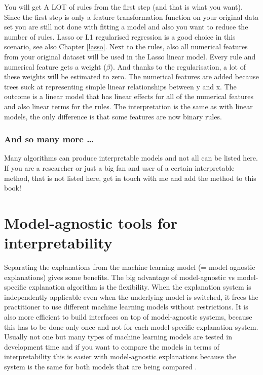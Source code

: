 \documentclass[12pt,]{krantz}
\theoremstyle{definition}
\theoremstyle{definition}
\theoremstyle{definition}
\theoremstyle{remark}
\begin{document}
You will get A LOT of rules from the first step (and that is what you
want). Since the first step is only a feature transformation function on
your original data set you are still not done with fitting a model and
also you want to reduce the number of rules. Lasso or L1 regularised
regression is a good choice in this scenario, see also Chapter
\ref{lasso}. Next to the rules, also all numerical features from your
original dataset will be used in the Lasso linear model. Every rule and
numerical feature gets a weight (\(\beta\)). And thanks to the
regularisation, a lot of these weights will be estimated to zero. The
numerical features are added because trees suck at representing simple
linear relationships between y and x. The outcome is a linear model that
has linear effects for all of the numerical features and also linear
terms for the rules. The interpretation is the same as with linear
models, the only difference is that some features are now binary rules.

\subsection{And so many more \ldots{}}\label{and-so-many-more}

Many algorithms can produce interpretable models and not all can be
listed here. If you are a researcher or just a big fan and user of a
certain interpretable method, that is not listed here, get in touch with
me and add the method to this book!

\chapter{Model-agnostic tools for interpretability}\label{agnostic}

Separating the explanations from the machine learning model (=
model-agnostic explanations) gives some benefits. The big advantage of
model-agnostic vs model-specific explanation algorithm is the
flexibility. When the explanation system is independently applicable
even when the underlying model is switched, it frees the practitioner to
use different machine learning models without restrictions. It is also
more efficient to build interfaces on top of model-agnostic systems,
because this has to be done only once and not for each model-specific
explanation system. Usually not one but many types of machine learning
models are tested in development time and if you want to compare the
models in terms of interpretability this is easier with model-agnostic
explanations because the system is the same for both models that are
being compared \citep{Ribeiro2016b}.
\end{document}
